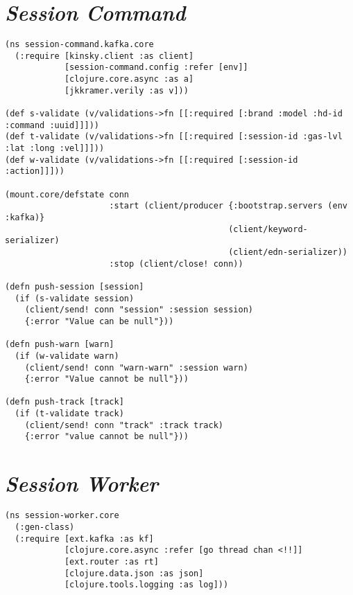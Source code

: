 \begin{apendicesenv}


\chapter{\textit{Session Command}}
\label{ap:sessioncommand}

\begin{lstlisting}
(ns session-command.kafka.core
  (:require [kinsky.client :as client]
            [session-command.config :refer [env]]
            [clojure.core.async :as a]
            [jkkramer.verily :as v]))

(def s-validate (v/validations->fn [[:required [:brand :model :hd-id :command :uuid]]]))
(def t-validate (v/validations->fn [[:required [:session-id :gas-lvl :lat :long :vel]]]))
(def w-validate (v/validations->fn [[:required [:session-id :action]]]))

(mount.core/defstate conn
                     :start (client/producer {:bootstrap.servers (env :kafka)}
                                             (client/keyword-serializer)
                                             (client/edn-serializer))
                     :stop (client/close! conn))

(defn push-session [session]
  (if (s-validate session)
    (client/send! conn "session" :session session)
    {:error "Value can be null"}))

(defn push-warn [warn]
  (if (w-validate warn)
    (client/send! conn "warn-warn" :session warn)
    {:error "Value cannot be null"}))

(defn push-track [track]
  (if (t-validate track)
    (client/send! conn "track" :track track)
    {:error "value cannot be null"}))
\end{lstlisting}

\chapter{\textit{Session Worker}}
\label{ap:sessionworker}
\begin{lstlisting}
(ns session-worker.core
  (:gen-class)
  (:require [ext.kafka :as kf]
            [clojure.core.async :refer [go thread chan <!!]]
            [ext.router :as rt]
            [clojure.data.json :as json]
            [clojure.tools.logging :as log]))


\end{lstlisting}
\end{apendicesenv}
